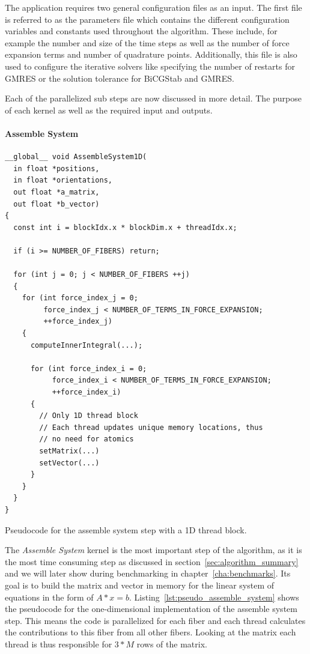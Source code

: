 \documentclass[a4paper,11pt]{kth-mag}
\begin{document}
The application requires two general configuration files as an input. The first file is referred to as the parameters file which contains the different configuration variables and constants used throughout the algorithm. These include, for example the number and size of the time steps as well as the number of force expansion terms and number of quadrature points. Additionally, this file is also used to configure the iterative solvers like specifying the number of restarts for GMRES or the solution tolerance for BiCGStab and GMRES.

Each of the parallelized sub steps are now discussed in more detail. The purpose of each kernel as well as the required input and outputs.

\paragraph{Assemble System}

\begin{listing}[!htbp]
  \centering
  \begin{verbatim}
__global__ void AssembleSystem1D(
  in float *positions,
  in float *orientations,
  out float *a_matrix,
  out float *b_vector)
{
  const int i = blockIdx.x * blockDim.x + threadIdx.x;

  if (i >= NUMBER_OF_FIBERS) return;

  for (int j = 0; j < NUMBER_OF_FIBERS ++j)
  {
    for (int force_index_j = 0;
         force_index_j < NUMBER_OF_TERMS_IN_FORCE_EXPANSION;
         ++force_index_j)
    {
      computeInnerIntegral(...);

      for (int force_index_i = 0;
           force_index_i < NUMBER_OF_TERMS_IN_FORCE_EXPANSION;
           ++force_index_i)
      {
        // Only 1D thread block
        // Each thread updates unique memory locations, thus
        // no need for atomics
        setMatrix(...)
        setVector(...)
      }
    }
  }
}
  \end{verbatim}
  \caption{Pseudocode for the assemble system step with a 1D thread block.}
  \label{lst:pseudo_assemble_system}
\end{listing}

The \emph{Assemble System} kernel is the most important step of the algorithm, as it is the most time consuming step as discussed in section~\ref{sec:algorithm_summary} and we will later show during benchmarking in chapter~\ref{cha:benchmarks}. Its goal is to build the matrix and vector in memory for the linear system of equations in the form of $A*x = b$. Listing~\ref{lst:pseudo_assemble_system} shows the pseudocode for the one-dimensional implementation of the assemble system step. This means the code is parallelized for each fiber and each thread calculates the contributions to this fiber from all other fibers. Looking at the matrix each thread is thus responsible for $3*M$ rows of the matrix.
\end{document}
